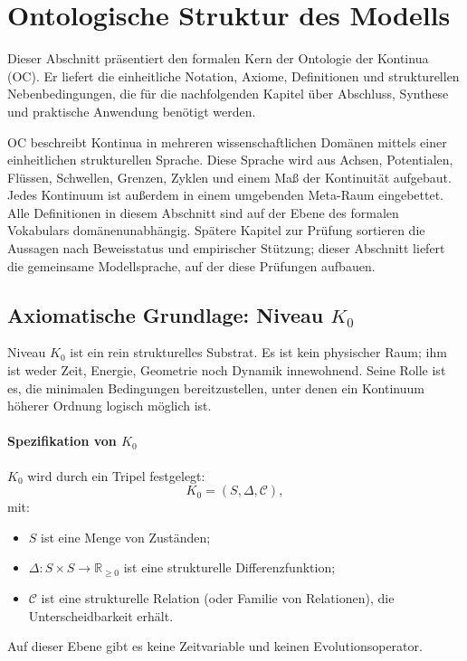 
\section{Ontologische Struktur des Modells}
\label{sec:model}

Dieser Abschnitt präsentiert den formalen Kern der Ontologie der Kontinua (OC).
Er liefert die einheitliche Notation, Axiome, Definitionen und strukturellen
Nebenbedingungen, die für die nachfolgenden Kapitel über Abschluss,
Synthese und praktische Anwendung benötigt werden.

OC beschreibt Kontinua in mehreren wissenschaftlichen Domänen mittels einer
einheitlichen strukturellen Sprache. Diese Sprache wird aus Achsen,
Potentialen, Flüssen, Schwellen, Grenzen, Zyklen und einem Maß der
Kontinuität aufgebaut. Jedes Kontinuum ist außerdem in einem umgebenden
Meta-Raum eingebettet. Alle Definitionen in diesem Abschnitt sind auf der
Ebene des formalen Vokabulars domänenunabhängig. Spätere Kapitel zur
Prüfung sortieren die Aussagen nach Beweisstatus und empirischer
Stützung; dieser Abschnitt liefert die gemeinsame Modellsprache, auf der diese
Prüfungen aufbauen.

\subsection{Axiomatische Grundlage: Niveau \texorpdfstring{$K_0$}{K\_0}}

Niveau \(K_0\) ist ein rein strukturelles Substrat.
Es ist kein physischer Raum; ihm ist weder Zeit, Energie, Geometrie noch Dynamik
innewohnend.
Seine Rolle ist es, die minimalen Bedingungen bereitzustellen, unter denen ein
Kontinuum höherer Ordnung logisch möglich ist.

\paragraph{Spezifikation von \texorpdfstring{\(K_0\)}{K\_0}}
\(K_0\) wird durch ein Tripel festgelegt:
\[
    K_0 = (S,\Delta,\mathcal{C}),
\]
mit:
\begin{itemize}
    \item \(S\) ist eine Menge von Zuständen;
    \item \(\Delta : S \times S \to \mathbb{R}_{\ge 0}\) ist eine strukturelle
          Differenzfunktion;
    \item \(\mathcal{C}\) ist eine strukturelle Relation (oder Familie von
          Relationen), die Unterscheidbarkeit erhält.
\end{itemize}
Auf dieser Ebene gibt es keine Zeitvariable und keinen Evolutionsoperator.

